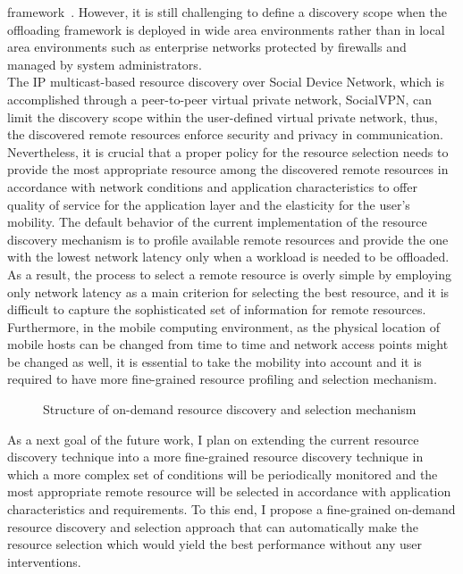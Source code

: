 framework~\cite{feng}.
%
However, it is still challenging to define a discovery scope when the
offloading framework is deployed in wide area environments rather than
in local area environments such as enterprise networks protected by
firewalls and managed by system administrators.\\
%
The IP multicast-based resource discovery over Social Device
Network, which is accomplished through a peer-to-peer virtual private network,
SocialVPN, can limit the discovery scope within the user-defined virtual
private network, thus, the discovered remote resources enforce security
and privacy in communication.
%
Nevertheless, it is crucial that a proper policy for the resource
selection needs to provide the most appropriate resource among the discovered
remote resources in accordance with network conditions and application
characteristics to offer quality of service for the application layer
and the elasticity for the user's mobility. 
%
The default behavior of the current implementation of the resource 
discovery mechanism is to profile available remote resources and 
provide the one with the lowest network latency only when a workload 
is needed to be offloaded.
%
As a result, the process to select a remote resource is overly simple by
employing only network latency as a main criterion for selecting the
best resource, and it is difficult to capture the sophisticated set of
information for remote resources.
%
Furthermore, in the mobile computing environment, as the physical
location of mobile hosts can be changed from time to time and
network access points might be changed as well, it is essential to take the
mobility into account and it is required to have more fine-grained
resource profiling and selection mechanism.\\
%
\begin{figure}
\centering
{}
\caption{Structure of on-demand resource discovery and selection
mechanism}
\label{fig:ondemand}
\end{figure}
%
As a next goal of the future work, I plan on extending the current resource 
discovery technique into a more fine-grained resource discovery technique in 
which a more complex set of conditions will be periodically monitored and the
most appropriate remote resource will be selected in accordance with
application characteristics and requirements.
%
To this end, I propose a fine-grained on-demand resource discovery and
selection approach that can automatically make the resource selection which would
yield the best performance without any user interventions.
